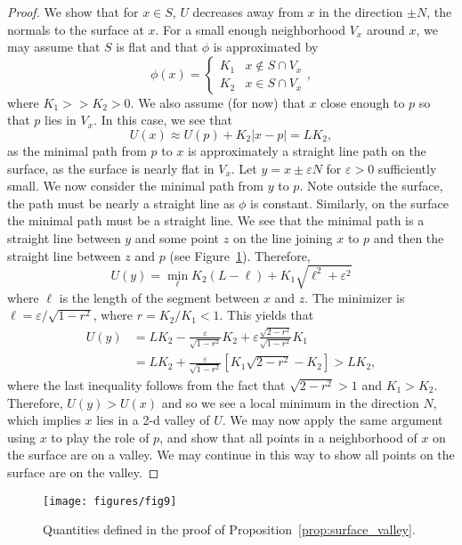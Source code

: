 \documentclass[10pt,journal,compsoc]{IEEEtran}
\begin{document}
\begin{proof}
  We show that for $x\in S$, $U$ decreases away from $x$ in
  the direction $\pm N$, the normals to the surface at $x$. For a
  small enough neighborhood $V_x$ around $x$, we may assume that $S$
  is flat and that $\phi$ is approximated by
  \[
    \phi(x) = 
    \begin{cases}
      K_1 & x\notin S \cap V_x \\
      K_2 & x \in S \cap V_x
    \end{cases},
  \]
  where $K_1 >> K_2 > 0$. We also assume (for now) that $x$ close
  enough to $p$ so that $p$ lies in $V_x$. In this case, we see that
  \[
    U(x) \approx U(p) + K_2 |x-p| = L K_2,
  \]
  as the minimal path from $p$ to $x$ is approximately a straight line
  path on the surface, as the surface is nearly flat in $V_x$.
  Let $y = x \pm \varepsilon N$ for $\varepsilon > 0$ sufficiently
  small. We now consider the minimal path from $y$ to $p$. Note
  outside the surface, the path must be nearly a straight line as
  $\phi$ is constant. Similarly, on the surface the minimal path must be a
  straight line. We see that the minimal path is a straight line
  between $y$ and some point $z$ on the line joining $x$ to $p$ and then
  the straight line between $z$ and $p$ (see
  Figure~\ref{fig:surface_valley}). Therefore, 
  \[
    U(y) = \min_{\ell } K_2(L-\ell) + K_1\sqrt{ \ell^2 +\varepsilon^2 }
  \]
  where $\ell$ is the length of the segment between $x$ and $z$. The
  minimizer is $\ell = \varepsilon / \sqrt{1 - r^2}$, where $r =
  K_2/K_1 < 1$. This yields that 
  \begin{align*}
    U(y) &= L K_2 - \frac{ \varepsilon }{ \sqrt{1-r^2} } K_2 +
           \varepsilon \frac{ \sqrt{2-r^2} }{ \sqrt{1-r^2} } K_1 
           \\
         &= LK_2 + \frac{ \varepsilon }{ \sqrt{1-r^2} } [ K_1\sqrt{2-r^2} -
           K_2 ] > L K_2,
  \end{align*}
  where the last inequality follows from the fact that $\sqrt{2-r^2} >
  1$ and $K_1 > K_2$. Therefore, $U(y) > U(x)$ and so we see a local
  minimum in the direction $N$, which implies $x$ lies in a 2-d valley of
  $U$. We may now apply the same argument using $x$ to play the role
  of $p$, and show that all points in a neighborhood of $x$ on the
  surface are on a valley. We may continue in this way to show all
  points on the surface are on the valley.
\end{proof}

\begin{figure}
  \centering
  {\scriptsize
    \texttt{[image: figures/fig9]}
  }
  \caption{Quantities defined in the proof of
    Proposition~\ref{prop:surface_valley}. }
  \label{fig:surface_valley}
\end{figure}
\end{document}
